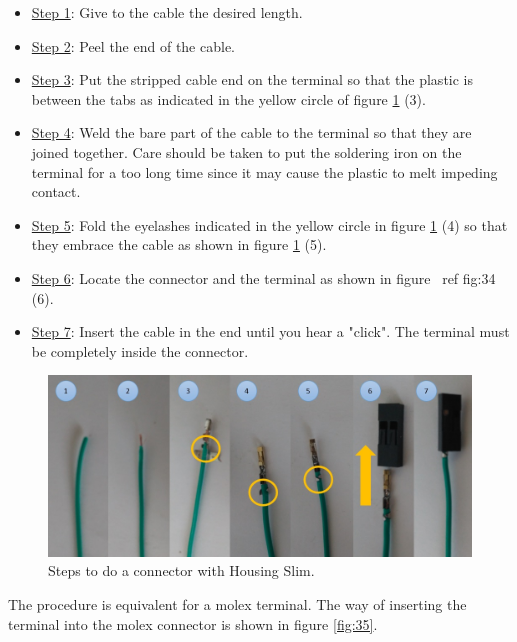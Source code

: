 \documentclass[12pt,letterpaper]{article}
\numberwithin{figure}{section}
\numberwithin{equation}{section}
\numberwithin{table}{section}
\begin{document}
\begin{itemize}
	\item \underline{Step 1}: Give to the cable the desired length.
	\item \underline{Step 2}: Peel the end of the cable.
 	\item \underline{Step 3}: Put the stripped cable end on the terminal so that the plastic is between the tabs as indicated in the yellow circle of figure \ref{fig:34} (3). 
	\item \underline{Step 4}: Weld the bare part of the cable to the terminal so that they are joined together. Care should be taken to put the soldering iron on the terminal for a too long time since it may cause the plastic to melt impeding contact.
	\item \underline{Step 5}: Fold the eyelashes indicated in the yellow circle in figure \ref{fig:34} (4) so that they embrace the cable as shown in figure \ref{fig:34} (5).
	\item \underline{Step 6}: Locate the connector and the terminal as shown in figure \ ref {fig:34} (6).
	\item \underline{Step 7}: Insert the cable in the end until you hear a "click". The terminal must be completely inside the connector.
\end{itemize}

\begin{figure}[H]
    \centering
    \includegraphics[scale=0.5]{Figuras/figure_34.jpg}
    \caption{Steps to do a connector with Housing Slim.}
    \label{fig:34}
\end{figure}

The procedure is equivalent for a molex terminal. The way of inserting the terminal into the molex connector is shown in figure \ref{fig:35}.
\end{document}
